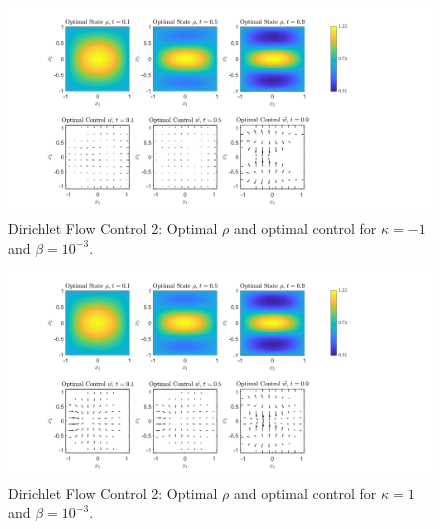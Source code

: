 \documentclass[11pt, a4paper]{article}
\theoremstyle{definition}
\begin{document}
	\begin{figure}[h]
		\centering
		\includegraphics[scale=0.35]{FcEx2kn1b.png}
		\caption{Dirichlet Flow Control 2: Optimal $\rho$ and optimal control for $\kappa = -1$ and $\beta = 10^{-3}$.} 
		\label{F5b}
	\end{figure}
	\begin{figure}[h]
		\centering
		\includegraphics[scale=0.35]{FcEx2k1b.png}
		\caption{Dirichlet Flow Control 2: Optimal $\rho$ and optimal control for $\kappa = 1$ and $\beta = 10^{-3}$.} 
		\label{F5c}
	\end{figure}
	
\end{document}
